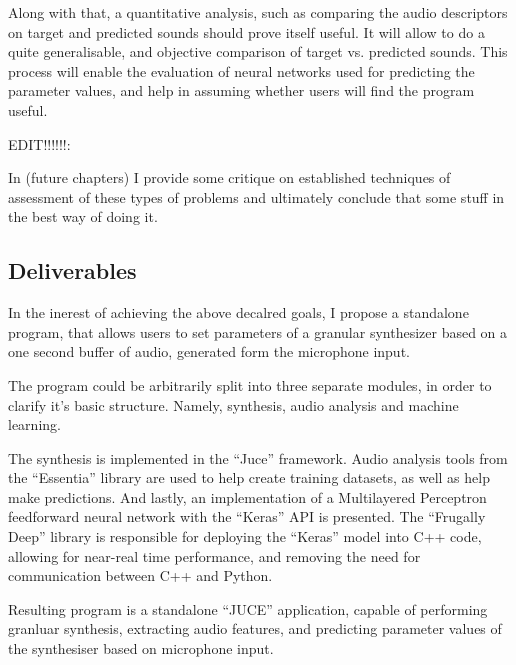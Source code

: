 Along with that, a quantitative analysis, such as comparing the audio
descriptors on target and predicted sounds should prove itself useful.
It will allow to do a quite generalisable, and objective comparison of
target vs. predicted sounds. This process will enable the evaluation
of neural networks used for predicting the parameter values, and help
in assuming whether users will find the program useful.  

EDIT!!!!!!:

In (future chapters) I provide some critique on established techniques of
assessment of these types of problems and ultimately conclude that some stuff in
the best way of doing it.

\subsection{Deliverables}

In the inerest of achieving the above decalred goals, I propose a
standalone program, that allows users to set parameters of a granular
synthesizer based on a one second buffer of audio, generated form the
microphone input.

The program could be arbitrarily split into three separate modules,
in order to clarify it's basic structure. Namely, synthesis, audio
analysis and machine learning.

The synthesis is implemented in the ``Juce'' framework. Audio analysis
tools from the ``Essentia'' library are used to help create training
datasets, as well as help make predictions. And lastly, an
implementation of a Multilayered Perceptron feedforward neural network
with the ``Keras'' API is presented. The ``Frugally Deep'' library is
responsible for deploying the ``Keras'' model into C++ code, allowing
for near-real time performance, and removing the need for
communication between C++ and Python. 

Resulting program is a standalone ``JUCE'' application, capable of
performing granluar synthesis, extracting audio features, and
predicting parameter values of the synthesiser based on microphone
input.


